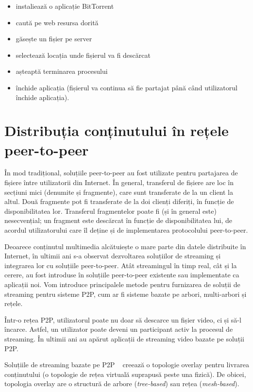 \begin{itemize}
  \item instaliează o aplicație BitTorrent
  \item caută pe web resursa dorită
  \item găsește un fișier pe server
  \item selectează locația unde fișierul va fi descărcat
  \item așteaptă terminarea procesului
  \item închide aplicația (fișierul va continua să fie partajat
                până când utilizatorul închide aplicația).
\end{itemize}

\section{Distribuția conținutului în rețele peer-to-peer}
\label{sec:p2p-systems:streaming}

În mod tradițional, soluțiile peer-to-peer au fost utilizate pentru partajarea
de fișiere între utilizatorii din Internet. În general, transferul de fișiere
are loc în secțiuni mici (denumite și fragmente), care sunt transferate de
la un client la altul. Două fragmente pot fi transferate de la doi clienți
diferiți, în funcție de disponibilitatea lor. Transferul fragmentelor poate fi
(și în general este) nesecvențial; un fragment este descărcat în funcție de
disponibilitatea lui, de acordul utilizatorului care îl deține și de
implementarea protocolului peer-to-peer.

Deoarece conținutul multimedia alcătuiește o mare parte din datele distribuite
în Internet, în ultimii ani s-a observat dezvoltarea soluțiilor de streaming
și integrarea lor cu soluțiile peer-to-peer. Atât streamingul în timp real,
cât și la cerere, au fost introduse în soluțiile peer-to-peer existente sau
implementate ca aplicații noi. Vom introduce principalele metode pentru
furnizarea de soluții de streaming pentru sisteme P2P, cum ar fi sisteme
bazate pe arbori, multi-arbori și rețele.

Într-o rețea P2P, utilizatorul poate nu doar să descarce un fișier video,
ci și să-l încarce. Astfel, un utilizator poate deveni un participant activ
la procesul de streaming. În ultimii ani au apărut aplicații de streaming video
bazate pe soluții P2P.

Soluțiile de streaming bazate pe P2P ~\cite{p2p-streaming-survey} creează o
topologie overlay pentru livrarea conținutului (o topologie de rețea virtuală
suprapusă peste una fizică). De obicei, topologia overlay are o structură
de arbore (\textit{tree-based}) sau rețea (\textit{mesh-based}).

